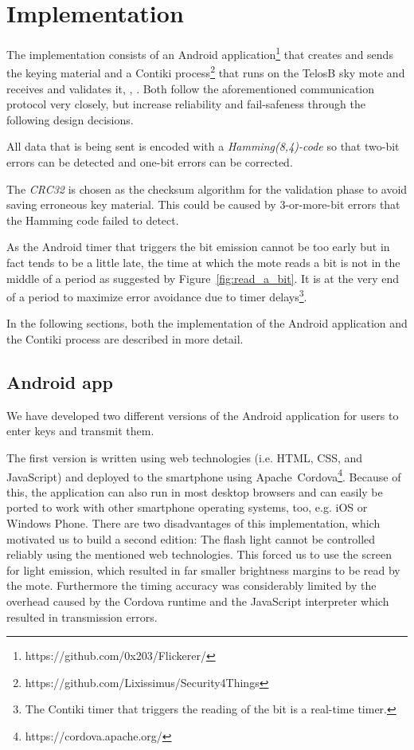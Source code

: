 \documentclass{sig-alternate} %
\begin{document}
\section{Implementation}
\label{sec:implementation}

The implementation consists of an Android application\footnote{https://github.com/0x203/Flickerer/} that creates and sends the keying material and a Contiki process\footnote{https://github.com/Lixissimus/Security4Things} that runs on the TelosB sky mote and receives and validates it, \cite{dunkels04contiki}, \cite{telosb}.
Both follow the aforementioned communication protocol very closely, but increase reliability and fail-safeness through the following design decisions.

All data that is being sent is encoded with a \textit{Hamming(8,4)-code} so that two-bit errors can be detected and one-bit errors can be corrected.

The \textit{CRC32} is chosen as the checksum algorithm for the validation phase to avoid saving erroneous key material.
This could be caused by 3-or-more-bit errors that the Hamming code failed to detect.

As the Android timer that triggers the bit emission cannot be too early but in fact tends to be a little late\cite{mongia2010reliable}, the time at which the mote reads a bit is not in the middle of a period as suggested by Figure~\ref{fig:read_a_bit}.
It is at the very end of a period to maximize error avoidance due to timer delays\footnote{The Contiki timer that triggers the reading of the bit is a real-time timer.}.

In the following sections, both the implementation of the Android application and the Contiki process are described in more detail.

\subsection{Android app}
\label{sub:android_app}

We have developed two different versions of the Android application for users to enter keys and transmit them.

The first version is written using web technologies (i.e. HTML, CSS, and JavaScript) and deployed to the smartphone using Apache~Cordova\footnote{https://cordova.apache.org/}.
Because of this, the application can also run in most desktop browsers and can easily be ported to work with other smartphone operating systems, too, e.g. iOS or Windows Phone.
There are two disadvantages of this implementation, which motivated us to build a second edition:
The flash light cannot be controlled reliably using the mentioned web technologies.
This forced us to use the screen for light emission, which resulted in far smaller brightness margins to be read by the mote.
Furthermore the timing accuracy was considerably limited by the overhead caused by the Cordova runtime and the JavaScript interpreter which resulted in transmission errors.
\end{document}
